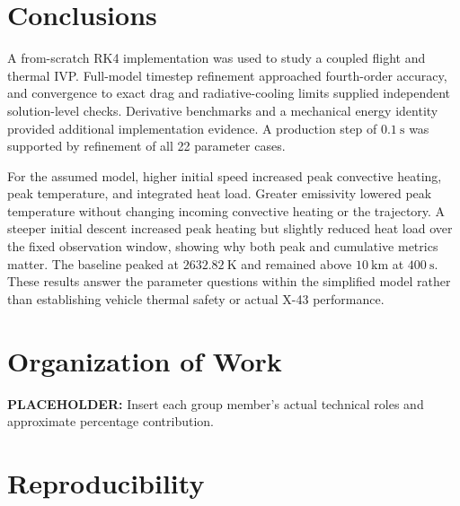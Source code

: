 \documentclass[conf]{new-aiaa}
\begin{document}
\section{Conclusions}

A from-scratch RK4 implementation was used to study a coupled flight and
thermal IVP. Full-model timestep refinement approached fourth-order accuracy,
and convergence to exact drag and radiative-cooling limits supplied independent
solution-level checks. Derivative benchmarks and a mechanical energy identity
provided additional implementation evidence. A production step of
$0.1~\mathrm{s}$ was supported by refinement of all 22 parameter cases.

For the assumed model, higher initial speed increased peak convective heating,
peak temperature, and integrated heat load. Greater emissivity lowered peak
temperature without changing incoming convective heating or the trajectory.
A steeper initial descent increased peak heating but slightly reduced heat
load over the fixed observation window, showing why both peak and cumulative
metrics matter. The baseline peaked at $2632.82~\mathrm{K}$ and remained
above $10~\mathrm{km}$ at $400~\mathrm{s}$. These results answer the parameter
questions within the simplified model rather than establishing vehicle
thermal safety or actual X-43 performance.

\section*{Organization of Work}
\noindent\textbf{PLACEHOLDER:} Insert each group member's actual technical roles
and approximate percentage contribution.

\section*{Reproducibility}
\end{document}
